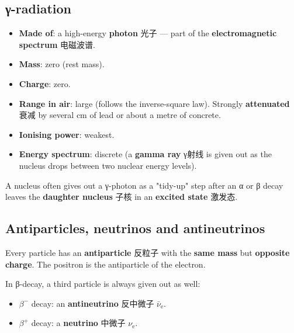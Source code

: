 \documentclass[11pt]{article}
\begin{document}
\subsection*{γ-radiation}

\begin{itemize}
\item \textbf{Made of}: a high-energy \textbf{photon} 光子 — part of the \textbf{electromagnetic spectrum} 电磁波谱.

\item \textbf{Mass}: zero (rest mass).

\item \textbf{Charge}: zero.

\item \textbf{Range in air}: large (follows the inverse-square law). Strongly \textbf{attenuated} 衰减 by several cm of lead or about a metre of concrete.

\item \textbf{Ionising power}: weakest.

\item \textbf{Energy spectrum}: discrete (a \textbf{gamma ray} γ射线 is given out as the nucleus drops between two nuclear energy levels).

\end{itemize}

A nucleus often gives out a γ-photon as a "tidy-up" step after an α or β decay leaves the \textbf{daughter nucleus} 子核 in an \textbf{excited state} 激发态.

\subsection*{Antiparticles, neutrinos and antineutrinos}

Every particle has an \textbf{antiparticle} 反粒子 with the \textbf{same mass} but \textbf{opposite charge}. The positron is the antiparticle of the electron.

In β-decay, a third particle is always given out as well:

\begin{itemize}
\item $\beta^{-}$ decay: an \textbf{antineutrino} 反中微子 $\bar{\nu}_{\text{e}}$.

\item $\beta^{+}$ decay: a \textbf{neutrino} 中微子 $\nu_{\text{e}}$.

\end{itemize}
\end{document}
